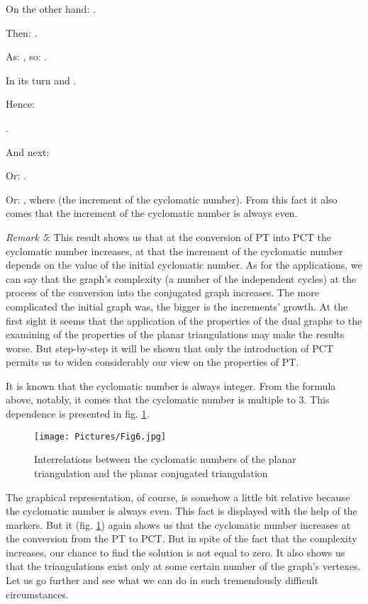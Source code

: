 \documentclass{amsart}
\theoremstyle{plain}
\numberwithin{equation}{section}
\begin{document}
On the other hand: .

Then: .

As: , so: .

In its turn  and .

Hence: 

.

And next: 


Or: 
.

Or: , where  (the increment of the cyclomatic number). From this fact it also comes that the increment of the cyclomatic number is always even. 

\textit{Remark 5}: This result shows us that at the conversion of PT into PCT the cyclomatic number increases, at that the increment of the cyclomatic number depends on the value of the initial cyclomatic number. As for the applications, we can say that the graph's complexity (a number of the independent cycles) at the process of the conversion into the conjugated graph increases. The more complicated the initial graph was, the bigger is the increments' growth. At the first sight it seems that the application of the properties of the dual graphs \cite {Malinina} to the examining of the properties of the planar triangulations may make the results worse. But step-by-step it will be shown that only the introduction of PCT permits us to widen considerably our view on the properties of PT.

It is known that the cyclomatic number is always integer. From the formula above, notably,  it comes that the cyclomatic number is multiple to 3. This dependence is presented in fig. \ref{Fig:6}.

\begin{figure}[htb]
	\texttt{[image: Pictures/Fig6.jpg]}
	\caption{Interrelations between the cyclomatic numbers of the planar triangulation and the planar conjugated triangulation}
	\label{Fig:6}
\end{figure}

The graphical representation, of course, is somehow a little bit relative because the cyclomatic number is always even. This fact is displayed with the help of the markers. But it (fig. \ref{Fig:6}) again shows us that the cyclomatic number increases at the conversion from the PT to PCT. But in spite of the fact that the complexity increases, our chance to find the solution is not equal to zero. It also shows us that the triangulations exist only at some certain number of the graph's vertexes. Let us go further and see what we can do in such tremendously difficult circumstances.
\end{document}
